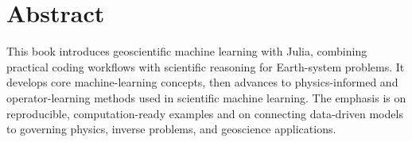 \chapter*{Abstract}

This book introduces geoscientific machine learning with Julia, combining practical coding workflows with scientific reasoning for Earth-system problems. It develops core machine-learning concepts, then advances to physics-informed and operator-learning methods used in scientific machine learning. The emphasis is on reproducible, computation-ready examples and on connecting data-driven models to governing physics, inverse problems, and geoscience applications.

\clearpage
